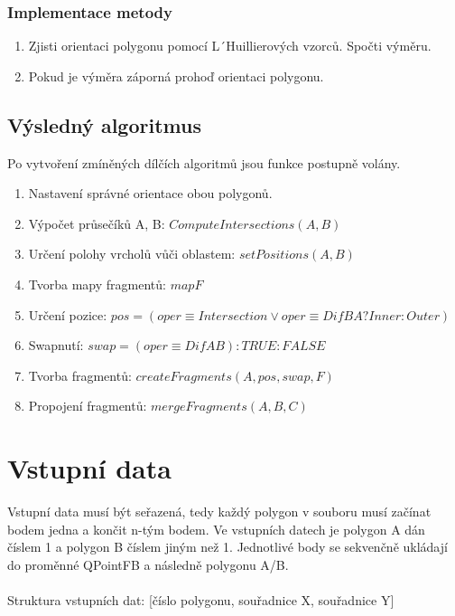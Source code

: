 \documentclass[a4paper, 12pt]{article}
\begin{document}
\subsubsection{Implementace metody}
\begin{enumerate}
\item Zjisti orientaci polygonu pomocí L´Huillierových vzorců.
\subsubitem Spočti výměru.
\item Pokud je výměra záporná prohoď orientaci polygonu.

\end{enumerate}


\subsection{Výsledný algoritmus}
Po vytvoření zmíněných dílčích algoritmů jsou funkce postupně volány.

\begin{enumerate}
\item Nastavení správné orientace obou polygonů.
\item Výpočet průsečíků A, B: $ComputeIntersections(A, B)$
\item Určení polohy vrcholů vůči oblastem: $setPositions(A, B) $
\item Tvorba mapy fragmentů: $map F$
\item Určení pozice: $pos = (oper \equiv Intersection \lor oper \equiv DifBA?Inner:Outer ) $
\item Swapnutí: $swap = (oper \equiv DifAB) : TRUE : FALSE$
\item Tvorba fragmentů: $createFragments(A, pos, swap, F)$
\item Propojení fragmentů: $mergeFragments(A, B, C)$
\end{enumerate}





\section{Vstupní data}
Vstupní data musí být seřazená, tedy každý polygon v souboru musí začínat bodem jedna a končit n-tým bodem.  Ve vstupních datech je polygon A dán číslem 1 a polygon B číslem jiným než 1. Jednotlivé body se sekvenčně ukládají do proměnné QPointFB a následně polygonu A/B.\\
\\
Struktura vstupních dat:
[číslo polygonu, souřadnice X, souřadnice Y]
\end{document}
